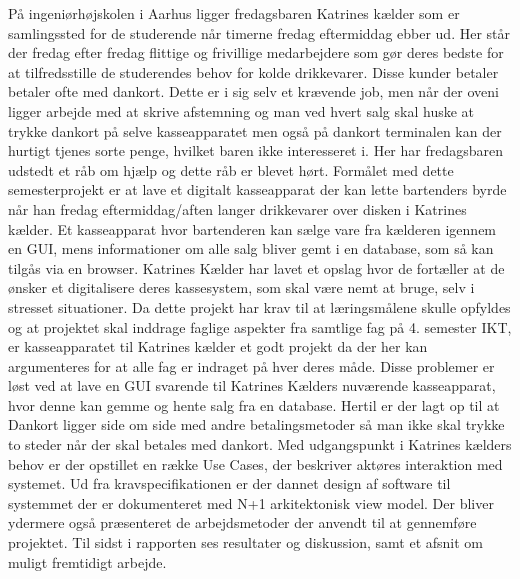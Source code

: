 \newpage
[indledning 2]\newline
På ingeniørhøjskolen i Aarhus ligger fredagsbaren Katrines kælder som er samlingssted for de studerende når timerne 
fredag eftermiddag ebber ud. Her står der fredag efter fredag flittige og frivillige medarbejdere som gør deres bedste for at 
tilfredsstille de studerendes behov for kolde drikkevarer. Disse kunder betaler betaler ofte med dankort. Dette er i sig selv et krævende job, men når der oveni ligger arbejde
med at skrive afstemning og man ved hvert salg skal huske at trykke dankort på selve kasseapparatet men også på dankort 
terminalen kan der hurtigt tjenes sorte penge, hvilket baren ikke interesseret i. 
Her har fredagsbaren udstedt et råb om hjælp og dette råb er blevet hørt. 
\newline
\newline
Formålet med dette semesterprojekt er at lave et digitalt kasseapparat der kan lette bartenders byrde når han fredag eftermiddag/aften langer drikkevarer over disken i Katrines kælder. Et kasseapparat hvor bartenderen kan sælge vare fra kælderen igennem en GUI, mens informationer om alle salg bliver gemt i en database, som så kan tilgås via en browser.
\newline
\newline
Katrines Kælder har lavet et opslag hvor de fortæller at de ønsker et digitalisere deres kassesystem, som skal være nemt at bruge, selv i stresset situationer. Da dette projekt har krav til at læringsmålene skulle opfyldes og at projektet skal inddrage faglige aspekter fra samtlige fag på 4. semester IKT, er kasseapparatet til Katrines kælder et godt projekt da der her kan argumenteres for at alle fag er indraget på hver deres måde.
\newline
\newline
Disse problemer er løst ved at lave en GUI svarende til Katrines Kælders nuværende kasseapparat, hvor denne kan gemme og hente salg fra en database. Hertil er der lagt op til at Dankort ligger side om side med andre betalingsmetoder så man ikke skal trykke to steder når der skal betales med dankort. 
\newline
\newline
Med udgangspunkt i Katrines kælders behov er der opstillet en række Use Cases, der beskriver aktøres interaktion med systemet. Ud fra kravspecifikationen er der dannet design af software til systemmet der er dokumenteret med N+1 arkitektonisk view model. Der bliver ydermere også præsenteret de arbejdsmetoder der anvendt til at gennemføre projektet. Til sidst i rapporten ses resultater og diskussion, samt et afsnit om muligt fremtidigt arbejde. 